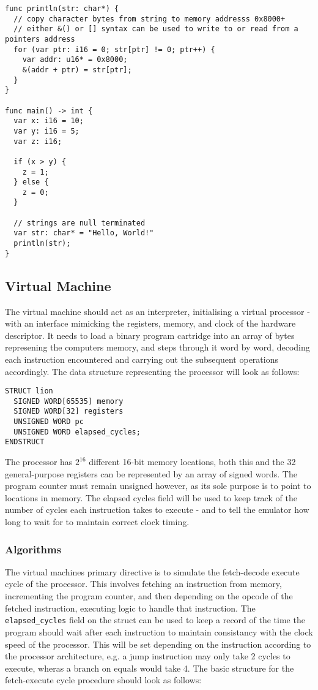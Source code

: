 \begin{lstlisting}
func println(str: char*) {
  // copy character bytes from string to memory addresss 0x8000+ 
  // either &() or [] syntax can be used to write to or read from a pointers address
  for (var ptr: i16 = 0; str[ptr] != 0; ptr++) {
    var addr: u16* = 0x8000; 
    &(addr + ptr) = str[ptr];
  }
}

func main() -> int {
  var x: i16 = 10;
  var y: i16 = 5;
  var z: i16;

  if (x > y) {
    z = 1;
  } else {
    z = 0;
  }

  // strings are null terminated
  var str: char* = "Hello, World!"
  println(str);
}
\end{lstlisting}

\subsection{Virtual Machine}
The virtual machine should act as an interpreter, initialising a virtual processor - with an interface mimicking the registers, memory, and clock of the hardware descriptor. It needs to load a binary program cartridge into an array of bytes represening the computers memory, and steps through it word by word, decoding each instruction encountered and carrying out the subsequent operations accordingly. The data structure representing the processor will look as follows:

\begin{lstlisting}
STRUCT lion
  SIGNED WORD[65535] memory
  SIGNED WORD[32] registers
  UNSIGNED WORD pc
  UNSIGNED WORD elapsed_cycles;
ENDSTRUCT
\end{lstlisting}

The processor has $2^{16}$ different 16-bit memory locations, both this and the 32 general-purpose registers can be  represented by an array of signed words. The program counter must remain unsigned however, as its sole purpose is to point to locations in memory. The elapsed cycles field will be used to keep track of the number of cycles each instruction takes to execute - and to tell the emulator how long to wait for to maintain correct clock timing.

\subsubsection{Algorithms}

The virtual machines primary directive is to simulate the fetch-decode execute cycle of the processor. This involves fetching an instruction from memory, incrementing the program counter, and then depending on the opcode of the fetched instruction, executing logic to handle that instruction. The \texttt{elapsed\_cycles} field on the struct can be used to keep a record of the time the program should wait after each instruction to maintain consistancy with the clock speed of the processor. This will be set depending on the instruction according to the processor architecture, e.g. a jump instruction may only take 2 cycles to execute, wheras a branch on equals would take 4. The basic structure for the fetch-execute cycle procedure should look as follows:

